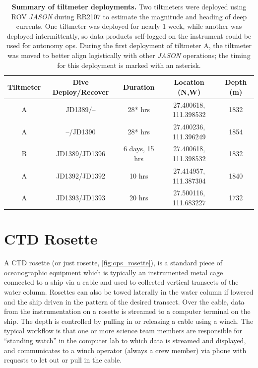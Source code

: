 \begin{table}[h!]
  \centering
  \begin{tabular}{c|c|c|c|c}
      Tiltmeter & Dive Deploy/Recover & Duration & Location (N,W) & Depth (m) \\
      \hline
      A & JD1389/-- & 28* hrs & 27.400618, 111.398532 & 1832 \\
      A & --/JD1390 & 28* hrs & 27.400236, 111.396249 & 1854 \\
      B & JD1389/JD1396 & 6 days, 15 hrs & 27.400618, 111.398532 & 1832 \\
      A & JD1392/JD1392 & 10 hrs & 27.414957, 111.387304 & 1840 \\
      A & JD1393/JD1393 & 20 hrs & 27.500116, 111.683227 & 1732 \\
  \end{tabular}
  \caption[Summary of tiltmeter deployments.]{\textbf{Summary of tiltmeter deployments.} Two tiltmeters were deployed using ROV \emph{JASON} during RR2107 to estimate the magnitude and heading of deep currents. One tiltmeter was deployed for nearly 1 week, while another was deployed intermittently, so data products self-logged on the instrument could be used for autonomy ops. During the first deployment of tiltmeter A, the tiltmeter was moved to better align logistically with other \emph{JASON} operations; the timing for this deployment is marked with an asterisk.}
  \label{tab:ops_tilt}
\end{table}


\section{CTD Rosette}
A CTD rosette (or just rosette, \cref{fig:ops_rosette}), is a standard piece of oceanographic equipment which is typically an instrumented metal cage connected to a ship via a cable and used to collected vertical transects of the water column. Rosettes can also be towed laterally in the water column if lowered and the ship driven in the pattern of the desired transect. Over the cable, data from the instrumentation on a rosette is streamed to a computer terminal on the ship. The depth is controlled by pulling in or releasing a cable using a winch. The typical workflow is that one or more science team members are responsible for ``standing watch'' in the computer lab to which data is streamed and displayed, and communicates to a winch operator (always a crew member) via phone with requests to let out or pull in the cable.

